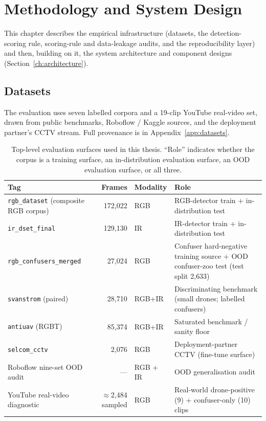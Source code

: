 \chapter{Methodology and System Design}
\label{ch:methodology}

This chapter describes the empirical infrastructure (datasets, the detection-scoring rule, scoring-rule and data-leakage audits, and the reproducibility layer) and then, building on it, the system architecture and component designs (Section~\ref{ch:architecture}).

\section{Datasets}
\label{sec:datasets}

The evaluation uses seven labelled corpora and a 19-clip YouTube real-video set, drawn from public benchmarks, Roboflow / Kaggle sources, and the deployment partner's CCTV stream. Full provenance is in Appendix~\ref{app:datasets}.

\begin{table}[htbp]
    \centering
    \caption{Top-level evaluation surfaces used in this thesis. ``Role'' indicates whether the corpus is a training surface, an in-distribution evaluation surface, an OOD evaluation surface, or all three.}
    \label{tab:datasets}
    \begin{tabular}{lrlp{5.6cm}}
        \toprule
        Tag & Frames & Modality & Role \\
        \midrule
        \texttt{rgb\_dataset} (composite RGB corpus) & 172,022 & RGB & RGB-detector train + in-distribution test \\
        \texttt{ir\_dset\_final} & 129,130 & IR & IR-detector train + in-distribution test \\
        \texttt{rgb\_confusers\_merged} & 27,024 & RGB & Confuser hard-negative training source + OOD confuser-zoo test (test split 2{,}633) \\
        \texttt{svanstrom} (paired) & 28,710 & RGB+IR & Discriminating benchmark (small drones; labelled confusers) \\
        \texttt{antiuav} (RGBT) & 85,374 & RGB+IR & Saturated benchmark / sanity floor \\
        \texttt{selcom\_cctv} & 2,076 & RGB & Deployment-partner CCTV (fine-tune surface) \\
        Roboflow nine-set OOD audit & --- & RGB + IR & OOD generalisation audit \\
        YouTube real-video diagnostic & $\approx$2{,}484 sampled & RGB & Real-world drone-positive (9) + confuser-only (10) clips \\
        \bottomrule
    \end{tabular}
\end{table}

